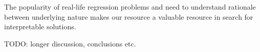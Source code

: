 The popularity of real-life regression problems and need to understand rationale between underlying nature makes our resource a valuable resource in search for interpretable solutions.



TODO: longer discussion, conclusions etc.


